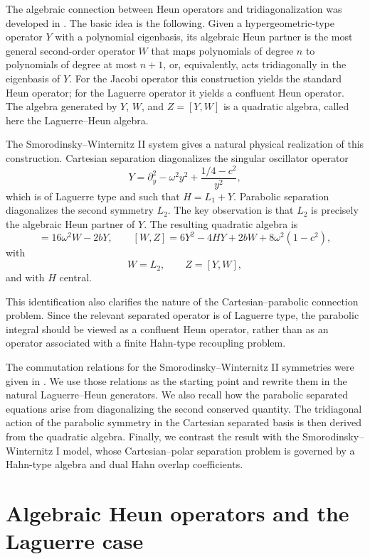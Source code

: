 \documentclass[11pt]{article}
\numberwithin{equation}{section}
\theoremstyle{definition}
\theoremstyle{remark}
\begin{document}
The algebraic connection between Heun operators and tridiagonalization was
developed in \cite{GVZ2017}.  The basic idea is the following.  Given a
hypergeometric-type operator \(Y\) with a polynomial eigenbasis, its algebraic
Heun partner is the most general second-order operator \(W\) that maps
polynomials of degree \(n\) to polynomials of degree at most \(n+1\), or,
equivalently, acts tridiagonally in the eigenbasis of \(Y\).  For the Jacobi
operator this construction yields the standard Heun operator; for the
Laguerre operator it yields a confluent Heun operator.  The algebra generated
by \(Y\), \(W\), and \(Z=[Y,W]\) is a quadratic algebra, called here the
Laguerre--Heun algebra.

The Smorodinsky--Winternitz II system gives a natural physical realization of
this construction.  Cartesian separation diagonalizes the singular oscillator
operator
\[
  Y=\partial_y^2-\omega^2y^2+\frac{1/4-c^2}{y^2},
\]
which is of Laguerre type and such that \(H=L_1+Y\).  Parabolic separation
diagonalizes the second symmetry \(L_2\).  The key observation is that \(L_2\) is precisely the
algebraic Heun partner of \(Y\).  The resulting quadratic algebra is
\begin{equation}
 [Y,Z]=16\omega^2W-2bY,
 \qquad
 [W,Z]=6Y^2-4HY+2bW+8\omega^2(1-c^2),
 \label{eq:intro-main}
\end{equation}
with
\[
        W=L_2,\qquad Z=[Y,W],
\]
and with \(H\) central.

This identification also clarifies the nature of the Cartesian--parabolic
connection problem.  Since the relevant separated operator is of Laguerre
type, the parabolic integral should be viewed as a confluent Heun operator,
rather than as an operator associated with a finite Hahn-type recoupling
problem.

The commutation relations for the Smorodinsky--Winternitz II symmetries were
given in \cite{LetourneauVinet1995}.  We use those relations as the starting
point and rewrite them in the natural Laguerre--Heun generators.  We also
recall how the parabolic separated equations arise from
diagonalizing the second conserved quantity.  The tridiagonal action of the
parabolic symmetry in the Cartesian separated basis is then derived from the
quadratic algebra.  Finally, we contrast the result with the
Smorodinsky--Winternitz I model, whose Cartesian--polar separation problem is
governed by a Hahn-type algebra and dual Hahn overlap coefficients.

\section{Algebraic Heun operators and the Laguerre case}
\end{document}
